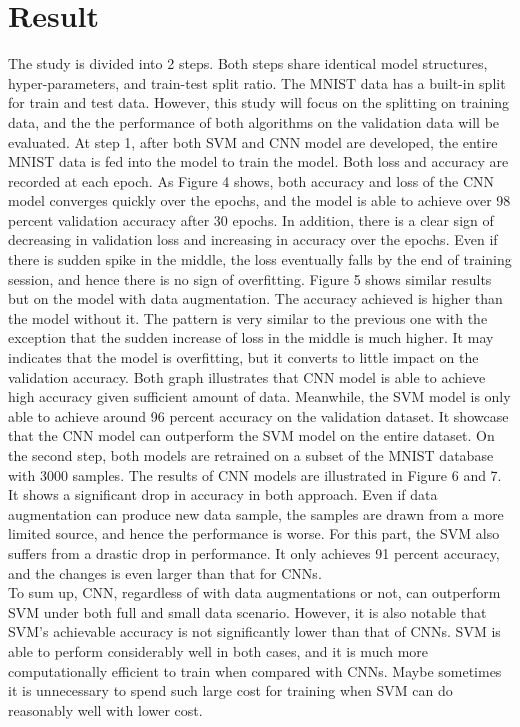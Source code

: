 \documentclass[letterpaper]{article} %
\begin{document}
\section{Result}
The study is divided into 2 steps. Both steps share identical model structures, hyper-parameters, and train-test split ratio. The MNIST data has a built-in split for train and test data. However, this study will focus on the splitting on training data, and the the performance of both algorithms on the validation data will be evaluated. At step 1, after both SVM and CNN model are developed, the entire MNIST data is fed into the model to train the model. Both loss and accuracy are recorded at each epoch.
As Figure 4 shows, both accuracy and loss of the CNN model converges quickly over the epochs, and the model is able to achieve over 98 percent validation accuracy after 30 epochs. In addition, there is a clear sign of decreasing in validation loss and increasing in accuracy over the epochs. Even if there is sudden spike in the middle, the loss eventually falls by the end of training session, and hence there is no sign of overfitting. 
Figure 5 shows similar results but on the model with data augmentation. The accuracy achieved is higher than the model without it. The pattern is very similar to the previous one with the exception that the sudden increase of loss in the middle is much higher. It may indicates that the model is overfitting, but it converts to little impact on the validation accuracy. Both graph illustrates that CNN model is able to achieve high accuracy given sufficient amount of data. Meanwhile, the SVM model is only able to achieve around 96 percent accuracy on the validation dataset. It showcase that the CNN model can outperform the SVM model on the entire dataset. On the second step, both models are retrained on a subset of the MNIST database with 3000 samples. The results of CNN models are illustrated in Figure 6 and 7. It shows a significant drop in accuracy in both approach. Even if data augmentation can produce new data sample, the samples are drawn from a more limited source, and hence the performance is worse. For this part, the SVM also suffers from a drastic drop in performance. It only achieves 91 percent accuracy, and the changes is even larger than that for CNNs. \\
To sum up, CNN, regardless of with data augmentations or not, can outperform SVM under both full and small data scenario. However, it is also notable that SVM's achievable accuracy is not significantly lower than that of CNNs. SVM is able to perform considerably well in both cases, and it is much more computationally efficient to train when compared with CNNs. Maybe sometimes it is unnecessary to spend such large cost for training when SVM can do reasonably well with lower cost.
\\
\newpage

\section{}
\mbox{}
\nocite{*}


\end{document}
